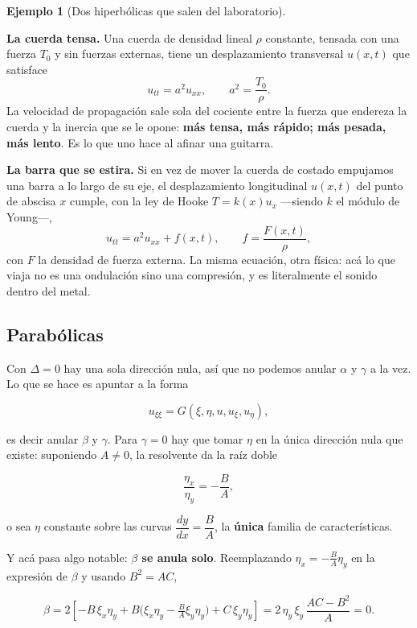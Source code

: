 \documentclass[
  spanish,
  a4paper,
]{scrbook}
\theoremstyle{definition}
\theoremstyle{plain}
\theoremstyle{definition}
\newtheorem{example}{Ejemplo}[chapter]
\theoremstyle{plain}
\theoremstyle{definition}
\theoremstyle{remark}
\begin{document}
\begin{example}[Dos hiperbólicas que salen del
laboratorio]\protect\hypertarget{exm-fisica-hiperbolicas}{}\label{exm-fisica-hiperbolicas}

\textbf{La cuerda tensa.} Una cuerda de densidad lineal \(\rho\)
constante, tensada con una fuerza \(T_0\) y sin fuerzas externas, tiene
un desplazamiento transversal \(u(x,t)\) que satisface \[
u_{tt} = a^2 u_{xx}, \qquad a^2 = \frac{T_0}{\rho} .
\] La velocidad de propagación sale sola del cociente entre la fuerza
que endereza la cuerda y la inercia que se le opone: \textbf{más tensa,
más rápido; más pesada, más lento}. Es lo que uno hace al afinar una
guitarra.

\textbf{La barra que se estira.} Si en vez de mover la cuerda de costado
empujamos una barra a lo largo de su eje, el desplazamiento longitudinal
\(u(x,t)\) del punto de abscisa \(x\) cumple, con la ley de Hooke
\(T = k(x)u_x\) ---siendo \(k\) el módulo de Young---, \[
u_{tt} = a^2u_{xx} + f(x,t), \qquad f = \frac{F(x,t)}{\rho} ,
\] con \(F\) la densidad de fuerza externa. La misma ecuación, otra
física: acá lo que viaja no es una ondulación sino una compresión, y es
literalmente el sonido dentro del metal.

\end{example}

\subsection{Parabólicas}\label{sec-canonica-parabolica}

Con \(\Delta = 0\) hay una sola dirección nula, así que no podemos
anular \(\alpha\) y \(\gamma\) a la vez. Lo que se hace es apuntar a la
forma

\[
u_{\xi\xi} = G(\xi,\eta,u,u_\xi,u_\eta),
\]

es decir anular \(\beta\) y \(\gamma\). Para \(\gamma = 0\) hay que
tomar \(\eta\) en la única dirección nula que existe: suponiendo
\(A \neq 0\), la resolvente da la raíz doble

\[
\frac{\eta_x}{\eta_y} = -\frac{B}{A} ,
\]

o sea \(\eta\) constante sobre las curvas
\(\dfrac{dy}{dx} = \dfrac{B}{A}\), la \textbf{única} familia de
características.

Y acá pasa algo notable: \textbf{\(\beta\) se anula solo}. Reemplazando
\(\eta_x = -\tfrac{B}{A}\eta_y\) en la expresión de \(\beta\) y usando
\(B^2 = AC\),

\[
\beta = 2\left[-B\,\xi_x\eta_y + B\Big(\xi_x\eta_y - \tfrac{B}{A}\xi_y\eta_y\Big) + C\,\xi_y\eta_y\right]
= 2\,\eta_y\,\xi_y\,\frac{AC-B^2}{A} = 0 .
\]
\end{document}
